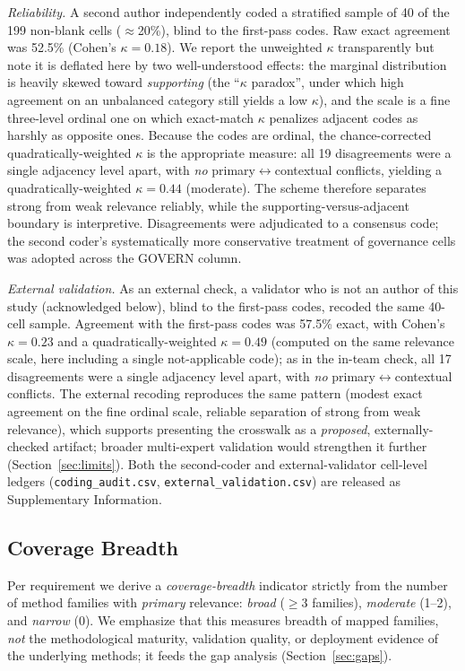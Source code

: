 \emph{Reliability.} A second author independently coded a stratified sample of 40 of the
199 non-blank cells ($\approx$20\%), blind to the first-pass codes. Raw exact agreement was
52.5\% (Cohen's $\kappa=0.18$). We report the unweighted $\kappa$ transparently but note it
is deflated here by two well-understood effects: the marginal distribution is heavily skewed
toward \emph{supporting} (the ``$\kappa$ paradox'', under which high agreement on an
unbalanced category still yields a low $\kappa$), and the scale is a fine three-level ordinal
one on which exact-match $\kappa$ penalizes adjacent codes as harshly as opposite ones. Because
the codes are ordinal, the chance-corrected quadratically-weighted $\kappa$ is the appropriate
measure: all 19 disagreements were a single adjacency level apart, with \emph{no}
primary$\leftrightarrow$contextual conflicts, yielding a quadratically-weighted
$\kappa=0.44$ (moderate). The scheme therefore separates strong from
weak relevance reliably, while the supporting-versus-adjacent boundary is interpretive.
Disagreements were adjudicated to a consensus code; the second
coder's systematically more conservative treatment of governance cells was adopted across
the GOVERN column.

\emph{External validation.} As an external check, a validator who is not an author of this
study (acknowledged below), blind to the first-pass codes,
recoded the same 40-cell sample. Agreement with the first-pass codes was 57.5\% exact, with
Cohen's $\kappa=0.23$ and a quadratically-weighted $\kappa=0.49$ (computed on the same
relevance scale, here including a single not-applicable code); as in the in-team check, all
17 disagreements were a single adjacency level apart, with \emph{no}
primary$\leftrightarrow$contextual conflicts. The external recoding
reproduces the same pattern (modest exact agreement on the fine ordinal scale, reliable
separation of strong from weak relevance), which supports presenting the crosswalk as a
\emph{proposed}, externally-checked artifact; broader multi-expert validation would
strengthen it further (Section~\ref{sec:limits}). Both the second-coder and external-validator
cell-level ledgers (\texttt{coding\_audit.csv}, \texttt{external\_validation.csv}) are
released as Supplementary Information.

\subsection{Coverage Breadth}
Per requirement we derive a \emph{coverage-breadth} indicator strictly from the number of
method families with \emph{primary} relevance: \emph{broad} ($\geq$3 families),
\emph{moderate} (1--2), and \emph{narrow} (0). We emphasize that this measures breadth of
mapped families, \emph{not} the methodological maturity, validation quality, or deployment
evidence of the underlying methods; it feeds the gap analysis (Section~\ref{sec:gaps}).

